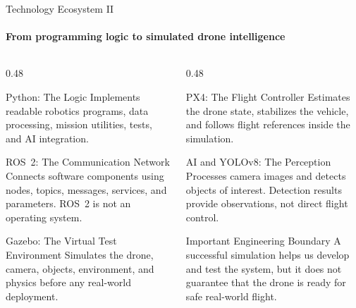 \begin{frame}{Technology Ecosystem II}
\framesubtitle{From programming logic to simulated drone intelligence}

\footnotesize

\begin{columns}[T,onlytextwidth]
    \begin{column}{0.48\textwidth}
        \begin{block}{Python: The Logic}
            Implements readable robotics programs, data processing,
            mission utilities, tests, and AI integration.
        \end{block}

        \begin{block}{ROS~2: The Communication Network}
            Connects software components using nodes, topics, messages,
            services, and parameters. ROS~2 is not an operating system.
        \end{block}

        \begin{block}{Gazebo: The Virtual Test Environment}
            Simulates the drone, camera, objects, environment, and physics
            before any real-world deployment.
        \end{block}
    \end{column}
    \hfill
    \begin{column}{0.48\textwidth}
        \begin{block}{PX4: The Flight Controller}
            Estimates the drone state, stabilizes the vehicle, and follows
            flight references inside the simulation.
        \end{block}

        \begin{block}{AI and YOLOv8: The Perception}
            Processes camera images and detects objects of interest.
            Detection results provide observations, not direct flight control.
        \end{block}

        \begin{alertblock}{Important Engineering Boundary}
            A successful simulation helps us develop and test the system,
            but it does not guarantee that the drone is ready for safe
            real-world flight.
        \end{alertblock}
    \end{column}
\end{columns}

\end{frame}


